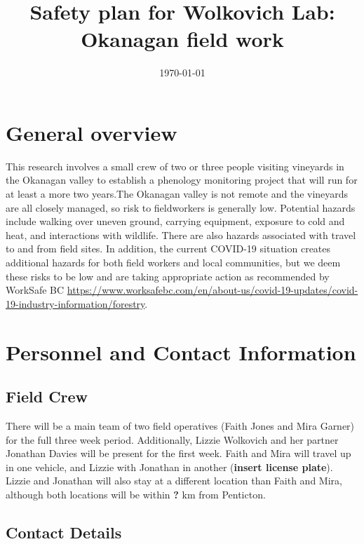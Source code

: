 \documentclass[11pt,letter]{article}
\begin{document}

\renewcommand{\refname}{\CHead{}}

\title{Safety plan for Wolkovich Lab: Okanagan field work}
\date{\today}
\maketitle
\tableofcontents

\section{General overview}
This research involves a small crew of two or three people visiting vineyards in the Okanagan valley to establish a phenology monitoring project that will run for at least a more two years.The Okanagan valley is not remote and the vineyards are all closely managed, so risk to fieldworkers is generally low. Potential hazards include walking over uneven ground, carrying equipment, exposure to cold and heat, and interactions with wildlife. There are also hazards associated with travel to and from field sites. In addition, the current COVID-19 situation creates additional hazards for both field workers and local communities, but we deem these risks to be low and are taking appropriate action as recommended by WorkSafe BC \url{https://www.worksafebc.com/en/about-us/covid-19-updates/covid-19-industry-information/forestry}. 

\section{Personnel and Contact Information}

\subsection {Field Crew}

There will be a main team of two field operatives (Faith Jones and Mira Garner) for the full three week period. Additionally, Lizzie Wolkovich and her partner Jonathan Davies will be present for the first week. Faith and Mira will travel up in one vehicle, and Lizzie with Jonathan in another (\textbf{insert license plate}). Lizzie and Jonathan will also stay at a different location than Faith and Mira, although both locations will be within \textbf{?} km from Penticton.   

\subsection {Contact Details}
\end{document}
